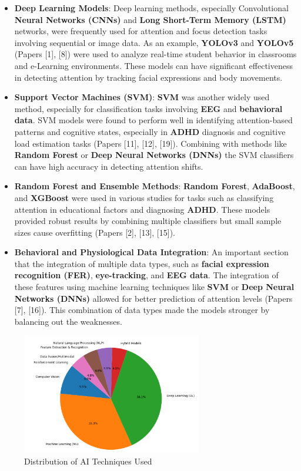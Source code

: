 \documentclass[12pt]{article}
\begin{document}
\begin{itemize}
    \item \textbf{Deep Learning Models}: Deep learning methods, especially Convolutional \textbf{Neural Networks (CNNs)} and \textbf{Long Short-Term Memory (LSTM)} networks, were frequently used for attention and focus detection tasks involving sequential or image data. As an example, \textbf{YOLOv3} and \textbf{YOLOv5} (Papers [1], [8]) were used to analyze real-time student behavior in classrooms and e-Learning environments. These models can have significant effectiveness in detecting attention by tracking facial expressions and body movements.
    \item \textbf{Support Vector Machines (SVM)}: \textbf{SVM} was another widely used method, especially for classification tasks involving \textbf{EEG} and \textbf{behavioral data}. SVM models were found to perform well in identifying attention-based patterns and cognitive states, especially in \textbf{ADHD} diagnosis and cognitive load estimation tasks (Papers [11], [12], [19]). Combining with methods like \textbf{Random Forest} or \textbf{Deep Neural Networks (DNNs)} the SVM classifiers can have high accuracy in detecting attention shifts.
    \item \textbf{Random Forest and Ensemble Methods}: \textbf{Random Forest}, \textbf{AdaBoost}, and \textbf{XGBoost} were used in various studies for tasks such as classifying attention in educational factors and diagnosing \textbf{ADHD}. These models provided robust results by combining multiple classifiers but small sample sizes cause overfitting (Papers [2], [13], [15]).
    \item \textbf{Behavioral and Physiological Data Integration}: An important section that the integration of multiple data types, such as \textbf{facial expression recognition (FER)}, \textbf{eye-tracking}, and \textbf{EEG data}. The integration of these features using machine learning techniques like \textbf{SVM} or \textbf{Deep Neural Networks (DNNs)} allowed for better prediction of attention levels (Papers [7], [16]). This combination of data types made the models stronger by balancing out the weaknesses.
\end{itemize}

\begin{figure}[H]
\centering
\includegraphics[width=0.7\textwidth]{piechart.png}
\caption{Distribution of AI Techniques Used}
\end{figure}
\end{document}
